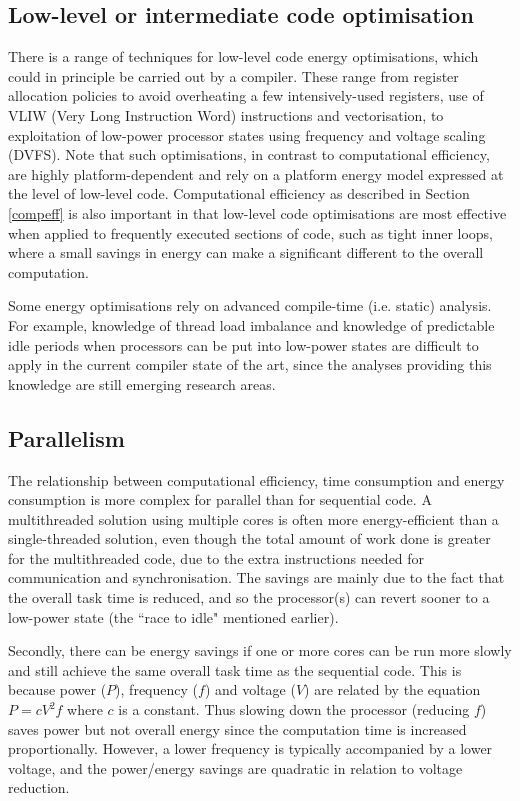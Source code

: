 \documentclass[11pt,oneside]{book}
\begin{document}
\subsection{Low-level or intermediate code optimisation}
There is a range of techniques for low-level code energy optimisations, which could in principle be carried out by a compiler.  These range from register allocation policies to avoid overheating a few intensively-used registers, use of VLIW (Very Long Instruction Word) instructions and vectorisation, to exploitation of low-power processor states using frequency and voltage scaling (DVFS).  Note that such optimisations, in contrast to computational efficiency, are highly platform-dependent and rely on a platform energy model expressed at the level of low-level code.  Computational efficiency as described in Section \ref{compeff} is also important  in that low-level code optimisations are most effective when applied to frequently executed sections of code, such as tight inner loops, where a small savings in energy can make a significant different to the overall computation. 

Some energy optimisations rely on advanced compile-time (i.e. static) analysis. For example, knowledge of thread load imbalance and knowledge of predictable idle periods when processors can be put into low-power states are difficult to apply in the current compiler state of the art, since the analyses providing this knowledge are still emerging research areas.


\subsection{Parallelism}

The relationship between computational efficiency, time consumption and energy consumption is more complex for parallel than for sequential code.  A multithreaded solution using multiple cores is often more energy-efficient than a single-threaded solution, even though the total amount of work done is greater for the multithreaded code, due to the extra instructions needed for communication and synchronisation. The savings are mainly due to the fact that the overall task time is reduced, and so the processor(s) can revert sooner to a low-power state (the ``race to idle" mentioned earlier).  

Secondly, there can be energy savings if one or more cores can be run more slowly and still achieve the same overall task time as the sequential code.  This is because power ($P$), frequency ($f$) and voltage ($V$) are related by the equation $P = c V^2 f$ where $c$ is a constant. Thus slowing down the processor (reducing $f$) saves power but not overall energy since the computation time is increased proportionally. However, a lower frequency is typically accompanied by a lower voltage, and the power/energy savings are quadratic in relation to voltage reduction.
\end{document}
